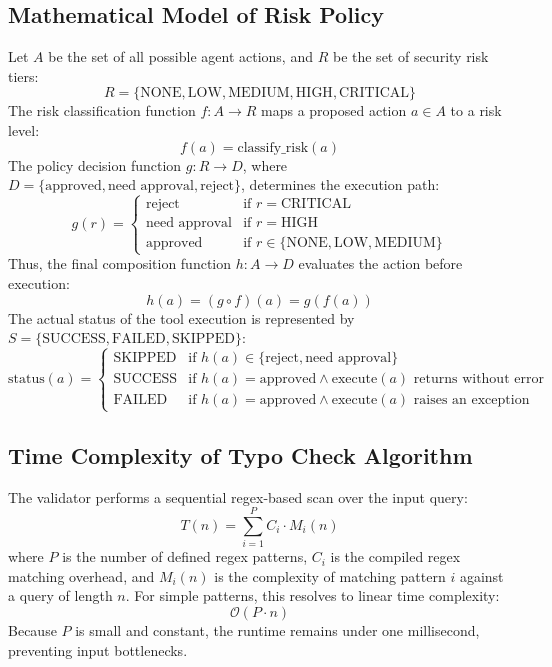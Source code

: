 \documentclass{article}
\begin{document}
\subsection{Mathematical Model of Risk Policy}
Let $A$ be the set of all possible agent actions, and $R$ be the set of security risk tiers:
\begin{equation}
R = \{\text{NONE}, \text{LOW}, \text{MEDIUM}, \text{HIGH}, \text{CRITICAL}\}
\end{equation}
The risk classification function $f: A \to R$ maps a proposed action $a \in A$ to a risk level:
\begin{equation}
f(a) = \text{classify\_risk}(a)
\end{equation}
The policy decision function $g: R \to D$, where $D = \{\text{approved}, \text{need approval}, \text{reject}\}$, determines the execution path:
\begin{equation}
g(r) = \begin{cases} 
\text{reject} & \text{if } r = \text{CRITICAL} \\
\text{need approval} & \text{if } r = \text{HIGH} \\
\text{approved} & \text{if } r \in \{\text{NONE}, \text{LOW}, \text{MEDIUM}\} 
\end{cases}
\end{equation}
Thus, the final composition function $h: A \to D$ evaluates the action before execution:
\begin{equation}
h(a) = (g \circ f)(a) = g(f(a))
\end{equation}
The actual status of the tool execution is represented by $S = \{\text{SUCCESS}, \text{FAILED}, \text{SKIPPED}\}$:
\begin{equation}
\text{status}(a) = \begin{cases}
\text{SKIPPED} & \text{if } h(a) \in \{\text{reject}, \text{need approval}\} \\
\text{SUCCESS} & \text{if } h(a) = \text{approved} \land \text{execute}(a) \text{ returns without error} \\
\text{FAILED} & \text{if } h(a) = \text{approved} \land \text{execute}(a) \text{ raises an exception}
\end{cases}
\end{equation}

\subsection{Time Complexity of Typo Check Algorithm}
The validator performs a sequential regex-based scan over the input query:
\begin{equation}
T(n) = \sum_{i=1}^{P} C_i \cdot M_i(n)
\end{equation}
where $P$ is the number of defined regex patterns, $C_i$ is the compiled regex matching overhead, and $M_i(n)$ is the complexity of matching pattern $i$ against a query of length $n$. For simple patterns, this resolves to linear time complexity:
\begin{equation}
\mathcal{O}(P \cdot n)
\end{equation}
Because $P$ is small and constant, the runtime remains under one millisecond, preventing input bottlenecks.
\end{document}

